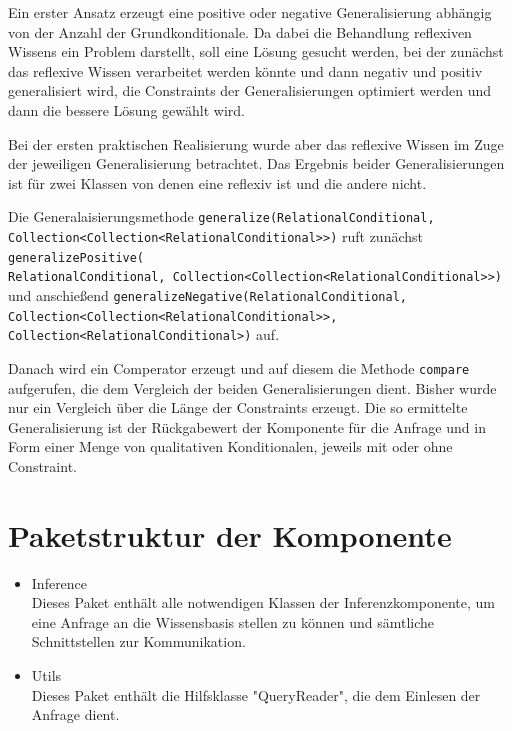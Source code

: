 \documentclass[a4paper, 11pt]{book}
\begin{document}
{Ein erster Ansatz erzeugt eine positive oder negative Generalisierung abhängig von der Anzahl der Grundkonditionale. Da dabei die Behandlung reflexiven Wissens ein Problem darstellt, soll eine Lösung gesucht werden, bei der zunächst das reflexive Wissen verarbeitet werden könnte und dann negativ und positiv generalisiert wird, die Constraints der Generalisierungen optimiert werden und dann die bessere Lösung gewählt wird. 

Bei der ersten praktischen Realisierung wurde aber das reflexive Wissen im Zuge der jeweiligen Generalisierung betrachtet. Das Ergebnis beider Generalisierungen ist für zwei Klassen von denen eine reflexiv ist und die andere nicht.

Die Generalaisierungsmethode \texttt{generalize(RelationalConditional,\\ Collection<Collection<RelationalConditional>>)} ruft zunächst \texttt{generalizePositive(\\RelationalConditional,
Collection<Collection<RelationalConditional>>)} und anschießend \texttt{generalizeNegative(RelationalConditional,\\
Collection<Collection<RelationalConditional>>,\\
Collection<RelationalConditional>)} auf.

Danach wird ein Comperator erzeugt und auf diesem die Methode \texttt{compare} aufgerufen, die dem Vergleich der beiden Generalisierungen dient. Bisher wurde nur ein Vergleich über die Länge der Constraints erzeugt.
Die so ermittelte Generalisierung ist der Rückgabewert der Komponente für die Anfrage und in Form einer Menge von qualitativen Konditionalen, jeweils mit oder ohne Constraint.






\section{Paketstruktur der Komponente}
\begin{itemize}
	\item Inference\\
	Dieses Paket enthält alle notwendigen Klassen der Inferenzkomponente, um eine Anfrage an die Wissensbasis stellen zu können und sämtliche Schnittstellen zur Kommunikation. 
	\item Utils\\
	Dieses Paket enthält die Hilfsklasse "{}QueryReader"{}, die dem Einlesen der Anfrage dient.
\end{itemize}

}
\end{document}
